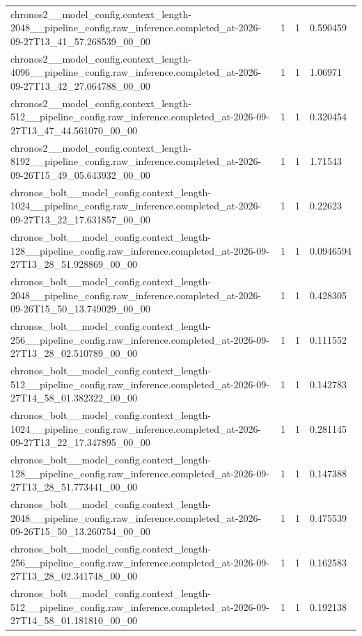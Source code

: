 \begin{tabular}{llll}
chronos2\_\_model\_config.context\_length-2048\_\_pipeline\_config.raw\_inference.completed\_at-2026-09-27T13\_41\_57.268539\_00\_00 & 1 & 1 & 0.590459 \\
chronos2\_\_model\_config.context\_length-4096\_\_pipeline\_config.raw\_inference.completed\_at-2026-09-27T13\_42\_27.064788\_00\_00 & 1 & 1 & 1.06971 \\
chronos2\_\_model\_config.context\_length-512\_\_pipeline\_config.raw\_inference.completed\_at-2026-09-27T13\_47\_44.561070\_00\_00 & 1 & 1 & 0.320454 \\
chronos2\_\_model\_config.context\_length-8192\_\_pipeline\_config.raw\_inference.completed\_at-2026-09-26T15\_49\_05.643932\_00\_00 & 1 & 1 & 1.71543 \\
chronos\_bolt\_\_model\_config.context\_length-1024\_\_pipeline\_config.raw\_inference.completed\_at-2026-09-27T13\_22\_17.631857\_00\_00 & 1 & 1 & 0.22623 \\
chronos\_bolt\_\_model\_config.context\_length-128\_\_pipeline\_config.raw\_inference.completed\_at-2026-09-27T13\_28\_51.928869\_00\_00 & 1 & 1 & 0.0946594 \\
chronos\_bolt\_\_model\_config.context\_length-2048\_\_pipeline\_config.raw\_inference.completed\_at-2026-09-26T15\_50\_13.749029\_00\_00 & 1 & 1 & 0.428305 \\
chronos\_bolt\_\_model\_config.context\_length-256\_\_pipeline\_config.raw\_inference.completed\_at-2026-09-27T13\_28\_02.510789\_00\_00 & 1 & 1 & 0.111552 \\
chronos\_bolt\_\_model\_config.context\_length-512\_\_pipeline\_config.raw\_inference.completed\_at-2026-09-27T14\_58\_01.382322\_00\_00 & 1 & 1 & 0.142783 \\
chronos\_bolt\_\_model\_config.context\_length-1024\_\_pipeline\_config.raw\_inference.completed\_at-2026-09-27T13\_22\_17.347895\_00\_00 & 1 & 1 & 0.281145 \\
chronos\_bolt\_\_model\_config.context\_length-128\_\_pipeline\_config.raw\_inference.completed\_at-2026-09-27T13\_28\_51.773441\_00\_00 & 1 & 1 & 0.147388 \\
chronos\_bolt\_\_model\_config.context\_length-2048\_\_pipeline\_config.raw\_inference.completed\_at-2026-09-26T15\_50\_13.260754\_00\_00 & 1 & 1 & 0.475539 \\
chronos\_bolt\_\_model\_config.context\_length-256\_\_pipeline\_config.raw\_inference.completed\_at-2026-09-27T13\_28\_02.341748\_00\_00 & 1 & 1 & 0.162583 \\
chronos\_bolt\_\_model\_config.context\_length-512\_\_pipeline\_config.raw\_inference.completed\_at-2026-09-27T14\_58\_01.181810\_00\_00 & 1 & 1 & 0.192138 \\

\end{tabular}
